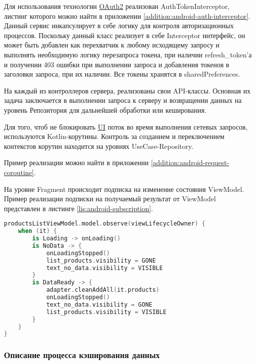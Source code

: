 Для использования технологии \hyperlink{gloss:oauth}{OAuth2} реализован AuthTokenInterceptor, листинг которого можно найти в приложении \ref{addition:android-auth-interceptor}.
Данный сервис инкапсулирует в себе логику для контроля авторизационных процессов.
Поскольку данный класс реализует в себе Interceptor интерфейс, он может быть добавлен как перехватчик к любому исходящему запросу и выполнять необходимую логику перезапроса токена, при наличии refresh\_token’а и получении 403 ошибки при выполнении запроса и добавления токенов в заголовки запроса, при их наличии.
Все токены хранятся в sharedPreferences.

На каждый из контроллеров сервера, реализованы свои API-классы.
Основная их задача заключается в выполнении запроса к серверу и возвращении данных на уровень Репозитория для дальнейшей обработки или кеширования.

Для того, чтоб не блокировать \hyperlink{gloss:ui}{UI} поток во время выполнения сетевых запросов, используются Kotlin-корутины.
Контроль за созданием и переключением контекстов корутин находится на уровнях UseCase-Repository.

Пример реализации можно найти в приложении \ref{addition:android-request-coroutine}.

На уровне Fragment происходит подписка на изменение состояния ViewModel.
Пример реализации подписки на получаемый результат от ViewModel представлен в листинге \ref{lis:android-subscription}.

\begin{minipage}{\textwidth}
\begin{lstlisting}[language=Kotlin, captionpos=b,
    label={lis:android-subscription},
    caption={Пример реализации подписки на ViewModel}
]
productsListViewModel.model.observe(viewLifecycleOwner) {
    when (it) {
        is Loading -> onLoading()
        is NoData -> {
            onLoadingStopped()
            list_products.visibility = GONE
            text_no_data.visibility = VISIBLE
        }
        is DataReady -> {
            adapter.cleanAddAll(it.products)
            onLoadingStopped()
            text_no_data.visibility = GONE
            list_products.visibility = VISIBLE
        }
    }
}
    \end{lstlisting}
\end{minipage}

\subsubsection{Описание процесса кэширования данных}\indent

